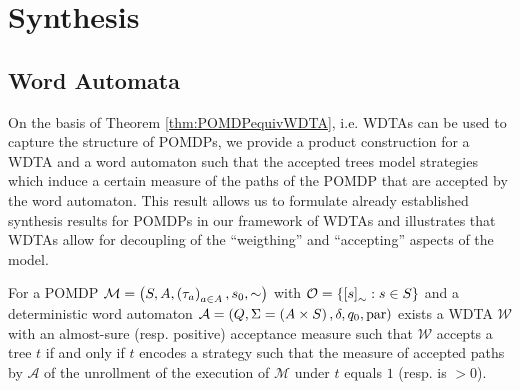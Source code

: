 \chapter{Synthesis}
\label{chapter:synthesis}

\section{Word Automata}
On the basis of Theorem \ref{thm:POMDPequivWDTA}, i.e. \acp{WDTA} can be used
to capture the structure of \acp{POMDP}, we provide a product construction for
a \ac{WDTA} and a word automaton such that the accepted trees model
strategies which induce a certain measure of the paths of the \ac{POMDP} that
are accepted by the word automaton. This result allows us to formulate already
established synthesis results for \acp{POMDP} in our framework of \acp{WDTA}
and illustrates that \acp{WDTA} allow for decoupling of the \enquote{weigthing}
and \enquote{accepting} aspects of the model.
\begin{theorem}
  For a \ac{POMDP}
  $\mathcal{M} = \left(S,A,\left(\tau_{a}\right)_{a\in A},s_{0},\sim\right)$
  with $\mathcal{O} = \left\{\left[s\right]_{\sim}:s\in S\right\}$ and a deterministic
  word automaton $\mathcal{A} = \left(Q, \Sigma = \left(A\times S\right), \delta,
  q_{0}, \operatorname{par}\right)$ exists a \ac{WDTA} $\mathcal{W}$ with an
  almost-sure (resp.  positive) acceptance measure such that $\mathcal{W}$
  accepts a tree $t$ if and only if $t$ encodes a strategy such that the
  measure of accepted paths by $\mathcal{A}$ of the unrollment of the execution
  of $\mathcal{M}$ under $t$ equals $1$ (resp. is $>0$).
\end{theorem}
